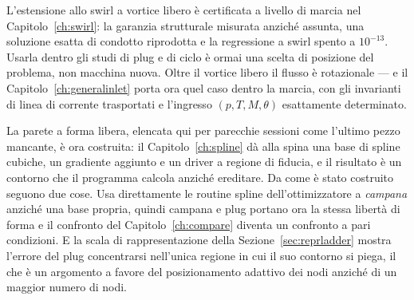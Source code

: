L'estensione allo swirl a vortice libero è certificata a livello di
marcia nel Capitolo~\ref{ch:swirl}: la garanzia strutturale misurata
anziché assunta, una soluzione esatta di condotto riprodotta e la
regressione a swirl spento a $10^{-13}$. Usarla dentro gli studi di
plug e di ciclo è ormai una scelta di posizione del problema, non
macchina nuova. Oltre il vortice libero il flusso è rotazionale ---
e il Capitolo~\ref{ch:generalinlet} porta ora quel caso dentro la
marcia, con gli invarianti di linea di corrente trasportati e
l'ingresso $(p, T, M, \theta)$ esattamente determinato.

La parete a forma libera, elencata qui per parecchie sessioni come
l'ultimo pezzo mancante, è ora costruita: il Capitolo~\ref{ch:spline}
dà alla spina una base di spline cubiche, un gradiente aggiunto e un
driver a regione di fiducia, e il risultato è un contorno che il
programma calcola anziché ereditare. Da come è stato costruito
seguono due cose. Usa direttamente le routine spline
dell'ottimizzatore a \emph{campana} anziché una base propria, quindi
campana e plug portano ora la stessa libertà di forma e il confronto
del Capitolo~\ref{ch:compare} diventa un confronto a pari condizioni.
E la scala di rappresentazione della Sezione~\ref{sec:reprladder}
mostra l'errore del plug concentrarsi nell'unica regione in cui il suo
contorno si piega, il che è un argomento a favore del posizionamento
adattivo dei nodi anziché di un maggior numero di nodi.

